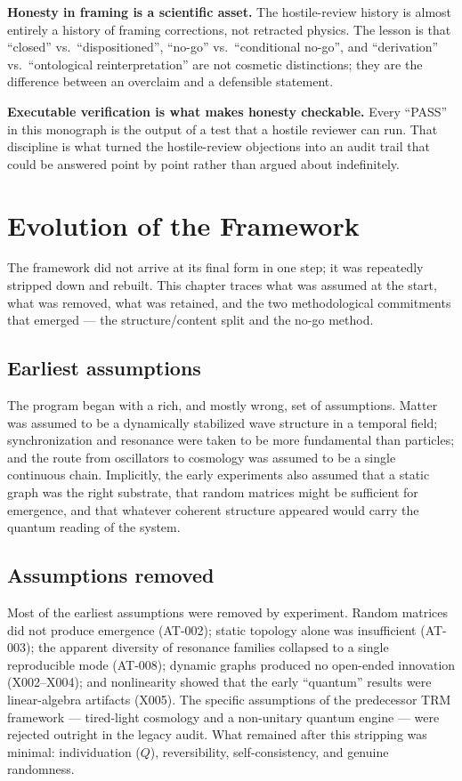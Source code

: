 \documentclass[10pt,twoside,openany]{book}
\begin{document}
\textbf{Honesty in framing is a scientific asset.} The hostile-review history is almost
entirely a history of framing corrections, not retracted physics. The lesson is that
``closed'' vs.\ ``dispositioned'', ``no-go'' vs.\ ``conditional no-go'', and ``derivation''
vs.\ ``ontological reinterpretation'' are not cosmetic distinctions; they are the
difference between an overclaim and a defensible statement.

\textbf{Executable verification is what makes honesty checkable.} Every ``PASS'' in this
monograph is the output of a test that a hostile reviewer can run. That discipline is what
turned the hostile-review objections into an audit trail that could be answered point by
point rather than argued about indefinitely.

\chapter{Evolution of the Framework}
\label{ch:evolution}

The framework did not arrive at its final form in one step; it was repeatedly stripped
down and rebuilt. This chapter traces what was assumed at the start, what was removed,
what was retained, and the two methodological commitments that emerged --- the
structure/content split and the no-go method.

\section{Earliest assumptions}

The program began with a rich, and mostly wrong, set of assumptions. Matter was assumed to
be a dynamically stabilized wave structure in a temporal field; synchronization and
resonance were taken to be more fundamental than particles; and the route from oscillators
to cosmology was assumed to be a single continuous chain. Implicitly, the early experiments
also assumed that a static graph was the right substrate, that random matrices might be
sufficient for emergence, and that whatever coherent structure appeared would carry the
quantum reading of the system.

\section{Assumptions removed}

Most of the earliest assumptions were removed by experiment. Random matrices did not
produce emergence (AT-002); static topology alone was insufficient (AT-003); the
apparent diversity of resonance families collapsed to a single reproducible mode (AT-008);
dynamic graphs produced no open-ended innovation (X002--X004); and nonlinearity showed that
the early ``quantum'' results were linear-algebra artifacts (X005). The specific assumptions
of the predecessor TRM framework --- tired-light cosmology and a non-unitary quantum engine
--- were rejected outright in the legacy audit. What remained after this stripping was
minimal: individuation ($Q$), reversibility, self-consistency, and genuine randomness.
\end{document}

